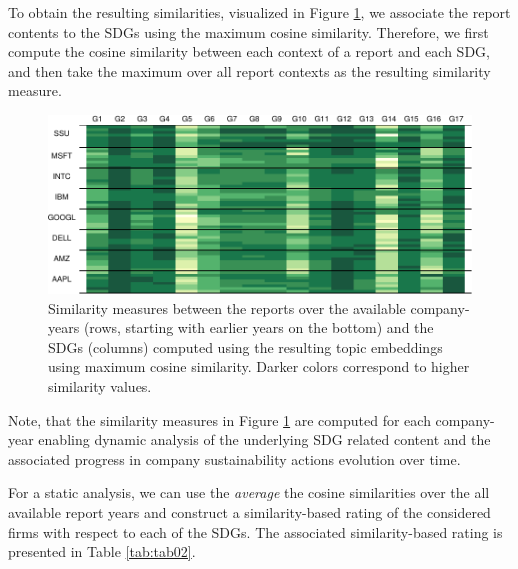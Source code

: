 \documentclass[
]{article}
\begin{document}
To obtain the resulting similarities, visualized in Figure \ref{fig:figcos}, we associate the report contents to the SDGs using the maximum cosine similarity. Therefore, we first compute the cosine similarity between each context of a report and each SDG, and then take the maximum over all report contexts as the resulting similarity measure.

\begin{figure}
\includegraphics[width=1\linewidth]{20240606_sustain_dim_files/figure-latex/figcos-1} \caption{Similarity measures between the reports over the available company-years (rows, starting with earlier years on the bottom) and the SDGs (columns) computed using the resulting topic embeddings using maximum cosine similarity. Darker colors correspond to higher similarity values.}\label{fig:figcos}
\end{figure}

Note, that the similarity measures in Figure \ref{fig:figcos} are computed for each company-year enabling dynamic analysis of the underlying SDG related content and the associated progress in company sustainability actions evolution over time.

For a static analysis, we can use the \emph{average} the cosine similarities over the all available report years and construct a similarity-based rating of the considered firms with respect to each of the SDGs. The associated similarity-based rating is presented in Table \ref{tab:tab02}.
\end{document}
